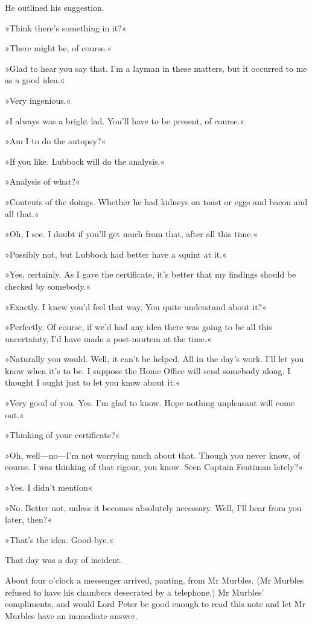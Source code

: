He outlined his suggestion.

»Think there's something in it?«

»There might be, of course.«

»Glad to hear you say that. I'm a layman in these matters, but it occurred to me as a good idea.«

»Very ingenious.«

»I always was a bright lad. You'll have to be present, of course.«

»Am I to do the autopsy?«

»If you like. Lubbock will do the analysis.«

»Analysis of what?«

»Contents of the doings. Whether he had kidneys on toast or eggs and bacon and all that.«

»Oh, I see. I doubt if you'll get much from that, after all this time.«

»Possibly not, but Lubbock had better have a squint at it.«

»Yes, certainly. As I gave the certificate, it's better that my findings should be checked by somebody.«

»Exactly. I knew you'd feel that way. You quite understand about it?«

»Perfectly. Of course, if we'd had any idea there was going to be all this uncertainty, I'd have made a post-mortem at the time.«

»Naturally you would. Well, it can't be helped. All in the day's work. I'll let you know when it's to be. I suppose the Home Office will send somebody along. I thought I ought just to let you know about it.«

»Very good of you. Yes. I'm glad to know. Hope nothing unpleasant will come out.«

»Thinking of your certificate?«

»Oh, well—no—I'm not worrying much about that. Though you never know, of course. I was thinking of that rigour, you know. Seen Captain Fentiman lately?«

»Yes. I didn't mention\longdash«

»No. Better not, unless it becomes absolutely necessary. Well, I'll hear from you later, then?«

»That's the idea. Good-bye.«

That day was a day of incident.

About four o'clock a messenger arrived, panting, from Mr Murbles. (Mr Murbles refused to have his chambers desecrated by a telephone.) Mr Murbles' compliments, and would Lord Peter be good enough to read this note and let Mr Murbles have an immediate answer.

